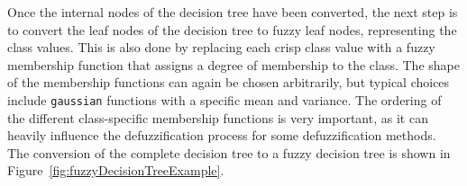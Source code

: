 Once the internal nodes of the decision tree have been converted, the next step is to convert the leaf nodes of the decision tree to fuzzy leaf nodes, representing the class values. This is also done by replacing each crisp class value with a fuzzy membership function that assigns a degree of membership to the class. The shape of the membership functions can again be chosen arbitrarily, but typical choices include \texttt{gaussian} functions with a specific mean and variance. The ordering of the different class-specific membership functions is very important, as it can heavily influence the defuzzification process for some defuzzification methods. The conversion of the complete decision tree to a fuzzy decision tree is shown in Figure~\ref{fig:fuzzyDecisionTreeExample}.


\begin{figure}[h]
    \centering
\end{figure}
